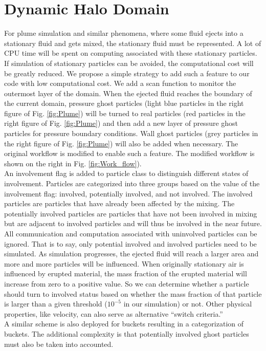 \section{Dynamic Halo Domain} 
For plume simulation and similar phenomena, where some fluid ejects into a stationary fluid and gets mixed, the stationary fluid must be represented.
A lot of CPU time will be spent on computing associated with these stationary particles. If simulation of stationary particles can be avoided, the computational cost will be greatly reduced.
We propose a simple strategy to add such a feature to our code with low computational cost. We add a scan function to monitor the outermost layer of the domain. When the ejected fluid reaches the boundary of the current domain, pressure ghost particles (light blue particles in the right figure of Fig. \ref{fig:Plume}) will be turned to real particles (red particles in the right figure of Fig. \ref{fig:Plume}) and then add a new layer of pressure ghost particles for pressure boundary conditions. Wall ghost particles (grey particles in the right figure of Fig. \ref{fig:Plume}) will also be added when necessary. The original workflow is modified to enable such a feature. The modified workflow is shown on the right in Fig. \ref{fig:Work_flow}).\\
An involvement flag is added to particle class to distinguish different states of involvement. Particles are categorized into three groups based on the value of the involvement flag: involved, potentially involved, and not involved. The involved particles are particles that have already been affected by the mixing. The potentially involved particles are particles that have not been involved in mixing but are adjacent to involved particles and will thus be involved in the near future. 
All communication and computation associated with uninvolved particles can be ignored. That is to say, only potential involved and involved particles need to be simulated.
As simulation progresses, the ejected fluid will reach a larger area and more and more particles will be influenced. When originally stationary air is influenced by erupted material, the mass fraction of the erupted material will increase from zero to a positive value. So we can determine whether a particle should turn to involved status based on whether the mass fraction of that particle is larger than a given threshold ($10^{-5} $ in our simulation) or not. Other physical properties, like velocity, can also serve as alternative ``switch criteria.''\\
A similar scheme is also deployed for buckets resulting in a categorization of buckets. The additional complexity is that potentially involved ghost particles must also be taken into accounted.
